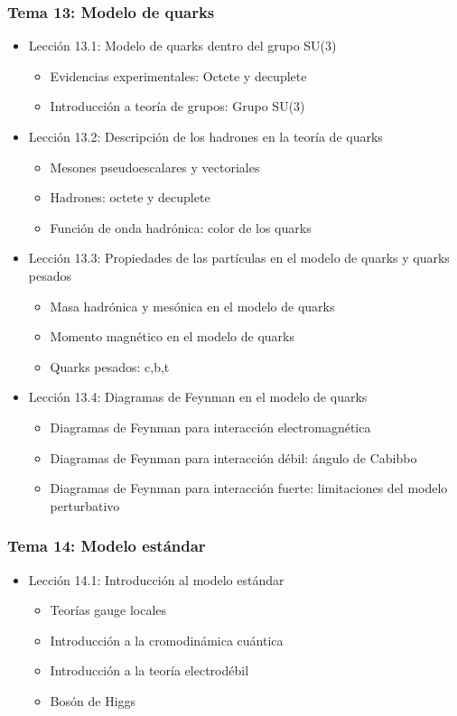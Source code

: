 \documentclass[a4paper,12pt,twoside]{article}
\begin{document}
\subsubsection*{Tema 13: Modelo de quarks}
\begin{itemize}
\item Lección 13.1: Modelo de quarks dentro del grupo SU(3)
\begin{itemize}
\item Evidencias experimentales: Octete y decuplete
\item Introducción a teoría de grupos: Grupo SU(3)
\end{itemize}
\item Lección 13.2: Descripción de los hadrones en la teoría de quarks
\begin{itemize}
\item Mesones pseudoescalares y vectoriales
\item Hadrones: octete y decuplete
\item Función de onda hadrónica: color de los quarks
\end{itemize}
\item Lección 13.3: Propiedades de las partículas en el modelo de quarks y quarks pesados
\begin{itemize}
\item Masa hadrónica y mesónica en el modelo de quarks
\item Momento magnético en el modelo de quarks
\item Quarks pesados: c,b,t
\end{itemize}
\item Lección 13.4: Diagramas de Feynman en el modelo de quarks
\begin{itemize}
\item Diagramas de Feynman para interacción electromagnética
\item Diagramas de Feynman para interacción débil: ángulo de Cabibbo
\item Diagramas de Feynman para interacción fuerte: limitaciones del modelo perturbativo
\end{itemize}
\end{itemize}

\subsubsection*{Tema 14: Modelo estándar}
\begin{itemize}
\item Lección 14.1: Introducción al modelo estándar
\begin{itemize}
\item Teorías gauge locales
\item Introducción a la cromodinámica cuántica
\item Introducción a la teoría electrodébil
\item Bosón de Higgs
\end{itemize}
\end{itemize}
\end{document}
